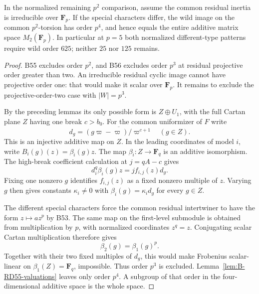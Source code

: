 \begin{theorem}
\label{thm:B-RD57}
In the normalized remaining $p^2$ comparison, assume the common
residual inertia is irreducible over $\mathbf F_p$.
If the special characters differ, the wild image on the common
$p^2$-torsion has order $p^4$, and hence equals the entire
additive matrix space $M_2(\mathbf F_p)$.
In particular at $p=5$ both normalized different-type patterns
require wild order $625$; neither $25$ nor $125$ remains.
\end{theorem}
\begin{proof}
B55 excludes order $p^2$, and B56 excludes order $p^3$ at residual
projective order greater than two. An irreducible residual cyclic
image cannot have projective order one: that would make it scalar
over $\mathbf F_p$. It remains to exclude the projective-order-two
case with $|W|=p^3$.

By the preceding lemmas its only possible form is $Z\oplus U_1$,
with the full Cartan plane $Z$ having one break $c>b_0$.
For the common uniformizer of $F$ write
\[
 d_g=\overline{(g\varpi-\varpi)/\varpi^{c+1}}
                         \quad(g\in Z).
\]
This is an injective additive map on $Z$. In the leading coordinates
of model $i$, write $B_i(g)(z)=\beta_i(g)z$.
The map $\beta_i:Z\to\mathbf F_q$ is an additive isomorphism.
The high-break coefficient calculation at $j=qA-c$ gives
\[
                     d_i^q\beta_i(g)z
                              =j f_{i,j}(z)d_g.          \tag{B-RD57.4}
\]
Fixing one nonzero $g$ identifies $f_{i,j}(z)$ as a fixed nonzero
multiple of $z$. Varying $g$ then gives constants $\kappa_i\ne0$
with $\beta_i(g)=\kappa_i d_g$ for every $g\in Z$.

The different special characters force the common residual
intertwiner to have the form $z\mapsto a z^p$ by B53.
The same map on the first-level submodule is obtained from
multiplication by $p$, with normalized coordinates $z^q=z$.
Conjugating scalar Cartan multiplication therefore gives
\[
                            \beta_2(g)=\beta_1(g)^p.
\]
Together with their two fixed multiples of $d_g$, this would make
Frobenius scalar-linear on $\beta_1(Z)=\mathbf F_q$, impossible.
Thus order $p^3$ is excluded. Lemma~\ref{lem:B-RD55-valuations}
leaves only order $p^4$. A subgroup of that order in the
four-dimensional additive space is the whole space.
\end{proof}

